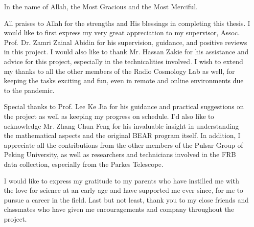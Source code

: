 \begin{acknowledgements}
    In the name of Allah, the Most Gracious and the Most Merciful.
    
    All praises to Allah for the strengths and His blessings in completing this thesis. I would like to first express my very great appreciation to my supervisor, Assoc. Prof. Dr. Zamri Zainal Abidin for his supervision, guidance, and positive reviews in this project. I would also like to thank Mr. Hassan Zakie for his assistance and advice for this project, especially in the technicalities involved. I wish to extend my thanks to all the other members of the Radio Cosmology Lab as well, for keeping the tasks exciting and fun, even in remote and online environments due to the pandemic.
    
    Special thanks to Prof. Lee Ke Jia for his guidance and practical suggestions on the project as well as keeping my progress on schedule. I'd also like to acknowledge Mr. Zhang Chun Feng for his invaluable insight in understanding the mathematical aspects and the original BEAR program itself. In addition, I appreciate all the contributions from the other members of the Pulsar Group of Peking University, as well as researchers and technicians involved in the FRB data collection, especially from the Parkes Telescope.
    
    I would like to express my gratitude to my parents who have instilled me with the love for science at an early age and have supported me ever since, for me to pursue a career in the field. Last but not least, thank you to my close friends and classmates who have given me encouragements and company throughout the project. 
\end{acknowledgements}